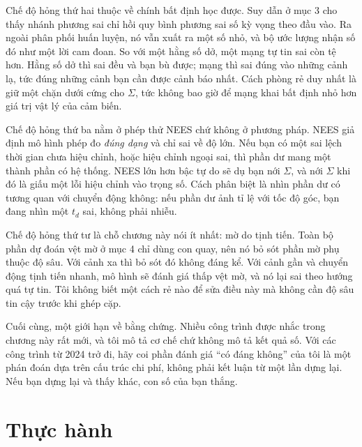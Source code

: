 \documentclass[../../deep_learning.tex]{subfiles}
\begin{document}
Chế độ hỏng thứ hai thuộc về chính bất định học được. Suy dẫn ở mục 3 cho thấy nhánh phương sai chỉ hồi quy bình phương sai số kỳ vọng theo đầu vào. Ra ngoài phân phối huấn luyện, nó vẫn xuất ra một số nhỏ, và bộ ước lượng nhận số đó như một lời cam đoan. So với một hằng số dở, một mạng tự tin sai còn tệ hơn. Hằng số dở thì sai đều và bạn bù được; mạng thì sai đúng vào những cảnh lạ, tức đúng những cảnh bạn cần được cảnh báo nhất. Cách phòng rẻ duy nhất là giữ một chặn dưới cứng cho \(\Sigma\), tức không bao giờ để mạng khai bất định nhỏ hơn giá trị vật lý của cảm biến.

Chế độ hỏng thứ ba nằm ở phép thử NEES chứ không ở phương pháp. NEES giả định mô hình phép đo \emph{đúng dạng} và chỉ sai về độ lớn. Nếu bạn có một sai lệch thời gian chưa hiệu chỉnh, hoặc hiệu chỉnh ngoại sai, thì phần dư mang một thành phần có hệ thống. NEES lớn hơn bậc tự do sẽ dụ bạn nới \(\Sigma\), và nới \(\Sigma\) khi đó là giấu một lỗi hiệu chỉnh vào trọng số. Cách phân biệt là nhìn phần dư có tương quan với chuyển động không: nếu phần dư ảnh tỉ lệ với tốc độ góc, bạn đang nhìn một \(t_d\) sai, không phải nhiễu.

Chế độ hỏng thứ tư là chỗ chương này nói ít nhất: mờ do tịnh tiến. Toàn bộ phần dự đoán vệt mờ ở mục 4 chỉ dùng con quay, nên nó bỏ sót phần mờ phụ thuộc độ sâu. Với cảnh xa thì bỏ sót đó không đáng kể. Với cảnh gần và chuyển động tịnh tiến nhanh, mô hình sẽ đánh giá thấp vệt mờ, và nó lại sai theo hướng quá tự tin. Tôi không biết một cách rẻ nào để sửa điều này mà không cần độ sâu tin cậy trước khi ghép cặp.

Cuối cùng, một giới hạn về bằng chứng. Nhiều công trình được nhắc trong chương này rất mới, và tôi mô tả cơ chế chứ không mô tả kết quả số. Với các công trình từ 2024 trở đi, hãy coi phần đánh giá ``có đáng không'' của tôi là một phán đoán dựa trên cấu trúc chi phí, không phải kết luận từ một lần dựng lại. Nếu bạn dựng lại và thấy khác, con số của bạn thắng.

\section{Thực hành}
\end{document}
